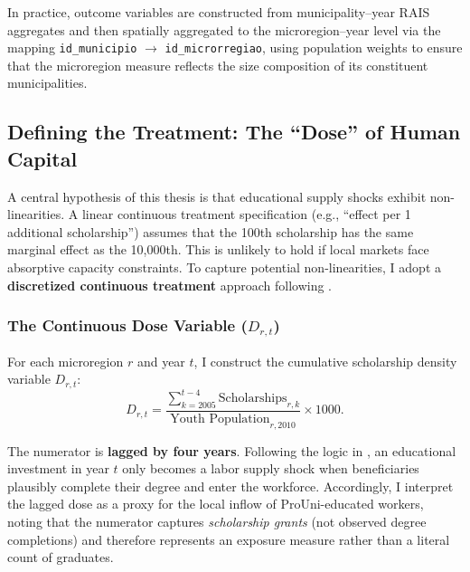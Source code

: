 In practice, outcome variables are constructed from municipality--year RAIS aggregates and then spatially aggregated to the microregion--year level via the mapping \texttt{id\_municipio} $\rightarrow$ \texttt{id\_microrregiao}, using population weights to ensure that the microregion measure reflects the size composition of its constituent municipalities.


\subsection{Defining the Treatment: The ``Dose'' of Human Capital}
\label{sec:treatment_def}

A central hypothesis of this thesis is that educational supply shocks exhibit non-linearities. A linear continuous treatment specification (e.g., ``effect per 1 additional scholarship'') assumes that the 100th scholarship has the same marginal effect as the 10,000th. This is unlikely to hold if local markets face absorptive capacity constraints. To capture potential non-linearities, I adopt a \textbf{discretized continuous treatment} approach following .

\subsubsection{The Continuous Dose Variable ($D_{r,t}$)}
For each microregion $r$ and year $t$, I construct the cumulative scholarship density variable $D_{r,t}$:
\begin{equation}
    D_{r,t} = \frac{\sum_{k=2005}^{t-4} \text{Scholarships}_{r,k}}{\text{Youth Population}_{r, 2010}} \times 1000.
    \label{eq:dose_variable}
\end{equation}

The numerator is \textbf{lagged by four years}. Following the logic in , an educational investment in year $t$ only becomes a labor supply shock when beneficiaries plausibly complete their degree and enter the workforce. Accordingly, I interpret the lagged dose as a proxy for the local inflow of ProUni-educated workers, noting that the numerator captures \emph{scholarship grants} (not observed degree completions) and therefore represents an exposure measure rather than a literal count of graduates.

